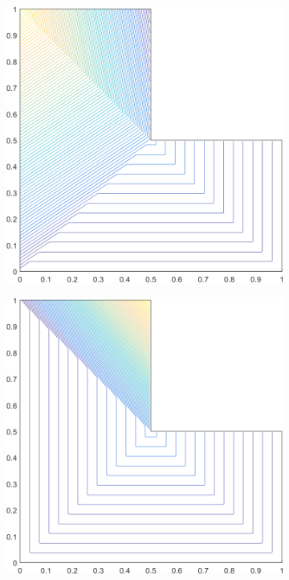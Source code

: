 \begin{figure}
\label{fig::2D_PWLD1_Ldom_basis_functions}
\centering
	\begin{subfigure}[b]{0.39\textwidth}
		\centering
		\includegraphics[width=\textwidth]{figures/sec_BF/L-domain_PWLD1_contour_b6.png}
		\caption{}
	\end{subfigure}
	\hspace{1.5cm}
	\begin{subfigure}[b]{0.39\textwidth}
		\centering
		\includegraphics[width=\textwidth]{figures/sec_BF/L-domain_PWLD1_contour_b5.png}

\end{subfigure}
\end{figure}
